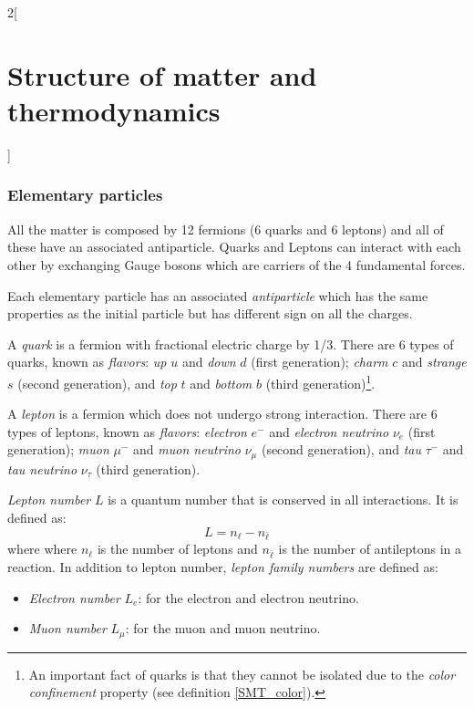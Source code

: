 \documentclass[../../../main.tex]{subfiles}
\begin{document}
\begin{multicols}{2}[\section{Structure of matter and thermodynamics}]
  \subsubsection{Elementary particles}
  \begin{definition}
    All the matter is composed by 12 fermions (6 quarks and 6 leptons) and all of these have an associated antiparticle. Quarks and Leptons can interact with each other by exchanging Gauge bosons which are carriers of the 4 fundamental forces.
  \end{definition}
  \begin{definition}[Antimatter]
    Each elementary particle has an associated \emph{antiparticle} which has the same properties as the initial particle but has different sign on all the charges.
  \end{definition}
  \begin{definition}[Quark]
    A \emph{quark} is a fermion with fractional electric charge by 1/3. There are 6 types of quarks, known as \emph{flavors}: \emph{up} $u$ and \emph{down} $d$ (first generation); \emph{charm} $c$ and \emph{strange} $s$ (second generation), and \emph{top} $t$ and \emph{bottom} $b$ (third generation)\footnote{An important fact of quarks is that they cannot be isolated due to the \emph{color confinement} property (see definition \cref{SMT_color}).}.
  \end{definition}
  \begin{definition}[Lepton]
    A \emph{lepton} is a fermion which does not undergo strong interaction. There are 6 types of leptons, known as \emph{flavors}: \emph{electron} $e^-$ and \emph{electron neutrino} $\nu_e$ (first generation); \emph{muon} $\mu^-$ and \emph{muon neutrino} $\nu_\mu$ (second generation), and \emph{tau} $\tau^-$ and \emph{tau neutrino} $\nu_\tau$ (third generation).
  \end{definition}
  \begin{definition}
    \emph{Lepton number} $L$ is a quantum number that is conserved in all interactions. It is defined as: $$L=n_\ell-n_{\bar{\ell}}$$ where where  $n_\ell$ is the number of leptons and $n_{\bar{\ell}}$ is the number of antileptons in a reaction. In addition to lepton number, \emph{lepton family numbers} are defined as:
    \begin{itemize}
      \item \emph{Electron number} $L_e$: for the electron and electron neutrino.
      \item \emph{Muon number} $L_\mu$: for the muon and muon neutrino.

\end{itemize}
\end{definition}
\end{multicols}
\end{document}
